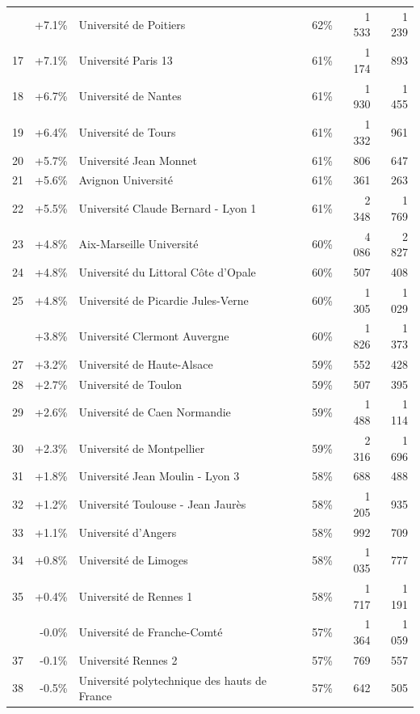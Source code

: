 \documentclass[12pt,french,]{article}
\begin{document}
\begin{longtable}{rrlrrr}
\addlinespace
16 & +7.1\% & Université de Poitiers & 62\% & 1 533 & 1 239\\
\rowcolor{gray!6}  17 & +7.1\% & Université Paris 13 & 61\% & 1 174 & 893\\
18 & +6.7\% & Université de Nantes & 61\% & 1 930 & 1 455\\
\rowcolor{gray!6}  19 & +6.4\% & Université de Tours & 61\% & 1 332 & 961\\
20 & +5.7\% & Université Jean Monnet & 61\% & 806 & 647\\
\addlinespace
\rowcolor{gray!6}  21 & +5.6\% & Avignon Université & 61\% & 361 & 263\\
22 & +5.5\% & Université Claude Bernard - Lyon 1 & 61\% & 2 348 & 1 769\\
\rowcolor{gray!6}  23 & +4.8\% & Aix-Marseille Université & 60\% & 4 086 & 2 827\\
24 & +4.8\% & Université du Littoral Côte d'Opale & 60\% & 507 & 408\\
\rowcolor{gray!6}  25 & +4.8\% & Université de Picardie Jules-Verne & 60\% & 1 305 & 1 029\\
\addlinespace
26 & +3.8\% & Université Clermont Auvergne & 60\% & 1 826 & 1 373\\
\rowcolor{gray!6}  27 & +3.2\% & Université de Haute-Alsace & 59\% & 552 & 428\\
28 & +2.7\% & Université de Toulon & 59\% & 507 & 395\\
\rowcolor{gray!6}  29 & +2.6\% & Université de Caen Normandie & 59\% & 1 488 & 1 114\\
30 & +2.3\% & Université de Montpellier & 59\% & 2 316 & 1 696\\
\addlinespace
\rowcolor{gray!6}  31 & +1.8\% & Université Jean Moulin - Lyon 3 & 58\% & 688 & 488\\
32 & +1.2\% & Université Toulouse - Jean Jaurès & 58\% & 1 205 & 935\\
\rowcolor{gray!6}  33 & +1.1\% & Université d'Angers & 58\% & 992 & 709\\
34 & +0.8\% & Université de Limoges & 58\% & 1 035 & 777\\
\rowcolor{gray!6}  35 & +0.4\% & Université de Rennes 1 & 58\% & 1 717 & 1 191\\
\addlinespace
36 & -0.0\% & Université de Franche-Comté & 57\% & 1 364 & 1 059\\
\rowcolor{gray!6}  37 & -0.1\% & Université Rennes 2 & 57\% & 769 & 557\\
38 & -0.5\% & Université polytechnique des hauts de France & 57\% & 642 & 505\\

\end{longtable}
\end{document}
